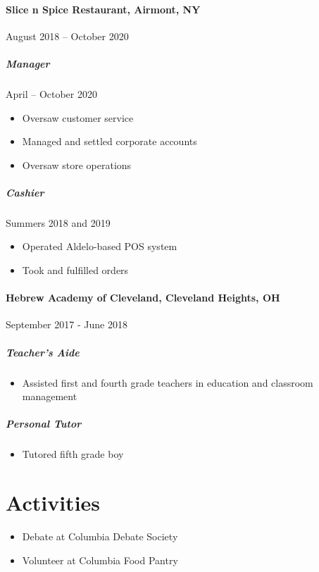 \documentclass[10pt]{article}
\begin{document}
    \paragraph*{Slice n Spice Restaurant, Airmont, NY} \hfill August 2018 – October 2020
    \subparagraph*{Manager} \hfill April – October 2020
    \begin{itemize}
        \item Oversaw customer service
        \item Managed and settled corporate accounts
        \item Oversaw store operations
    \end{itemize}
    \subparagraph*{Cashier} \hfill Summers 2018 and 2019
    \begin{itemize}
        \item Operated Aldelo-based POS system
        \item Took and fulfilled orders
    \end{itemize}

    \paragraph*{Hebrew Academy of Cleveland, Cleveland Heights, OH} \hfill  September 2017 - June 2018
    \subparagraph*{Teacher's Aide}
    \begin{itemize}
        \item  Assisted first and fourth grade teachers in education and classroom management
    \end{itemize}
    \subparagraph*{Personal Tutor}
    \begin{itemize}
        \item Tutored fifth grade boy
    \end{itemize}


\vfill
\section*{Activities}

    \begin{itemize}
        \item Debate at Columbia Debate Society
        \item Volunteer at Columbia Food Pantry
    \end{itemize}



\end{document}
